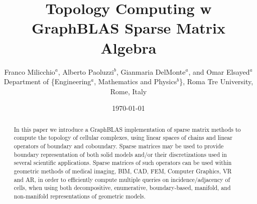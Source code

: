 \documentclass[]{article}
\title{%
Topology Computing w GraphBLAS Sparse Matrix Algebra
}
\author{Franco Milicchio$^a$, Alberto Paoluzzi$^b$, Gianmaria DelMonte$^a$, and Omar Elsayed$^a$\\
\small{Department of \{Engineering$^a$, Mathematics and Physics$^b$\}, Roma Tre University, Rome, Italy}\\[3mm]
}
\date{\today}
\begin{document}
\maketitle


\begin{abstract}
In this paper we introduce a GraphBLAS implementation of sparse matrix methods to compute the topology of cellular complexes, using linear spaces of chains and linear operators of boundary and coboundary. Sparse matrices may be used to provide boundary representation of both solid models and/or their discretizations used in several scientific applications. Sparse matrices of such operators can be used within geometric methods of medical imaging, BIM, CAD, FEM, Computer Graphics, VR and AR, in order to efficiently compute multiple queries on incidence/adjacency of  cells, when using both decompositive, enumerative, boundary-based, manifold, and non-manifold representations of geometric models.
\end{abstract}

\tableofcontents














\end{document}
